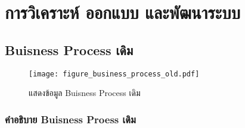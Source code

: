 \chapter{การวิเคราะห์ ออกแบบ และพัฒนาระบบ}
\label{chapter:problems}


\newpage
\section{Buisness Process เดิม}
\begin{figure}[h!]
    \centering
    \texttt{[image: figure\_business\_process\_old.pdf]}
    \caption{แสดงข้อมูล Buisness Process เดิม}
    \label{fig:buisness_process_old}
\end{figure}

\subsection{คำอธิบาย Buisness Proess เดิม}
